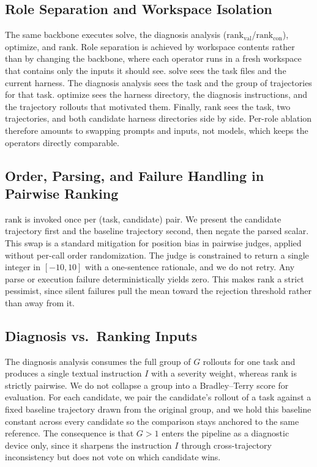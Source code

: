\documentclass{llmxive}
\begin{document}
\subsection{Role Separation and Workspace Isolation}

 The same backbone executes $\mathrm{solve}$, the diagnosis analysis ($\mathrm{rank}_{\mathrm{val}}$/$\mathrm{rank}_{\mathrm{con}}$), $\mathrm{optimize}$, and $\mathrm{rank}$. Role separation is achieved by workspace contents rather than by changing the backbone, where each operator runs in a fresh workspace that contains only the inputs it should see. $\mathrm{solve}$ sees the task files and the current harness. The diagnosis analysis sees the task and the group of trajectories for that task. $\mathrm{optimize}$ sees the harness directory, the diagnosis instructions, and the trajectory rollouts that motivated them. Finally, $\mathrm{rank}$ sees the task, two trajectories, and both candidate harness directories side by side. Per-role ablation therefore amounts to swapping prompts and inputs, not models, which keeps the operators directly comparable.

\subsection{Order, Parsing, and Failure Handling in Pairwise Ranking}

 $\mathrm{rank}$ is invoked once per (task, candidate) pair. We present the candidate trajectory first and the baseline trajectory second, then negate the parsed scalar. This swap is a standard mitigation for position bias in pairwise judges, applied without per-call order randomization. The judge is constrained to return a single integer in $[-10, 10]$ with a one-sentence rationale, and we do not retry. Any parse or execution failure deterministically yields zero. This makes $\mathrm{rank}$ a strict pessimist, since silent failures pull the mean toward the rejection threshold rather than away from it.

\subsection{Diagnosis vs.\ Ranking Inputs}

The diagnosis analysis consumes the full group of $G$ rollouts for one task and produces a single textual instruction $I$ with a severity weight, whereas $\mathrm{rank}$ is strictly pairwise. We do not collapse a group into a Bradley--Terry score for evaluation. For each candidate, we pair the candidate's rollout of a task against a fixed baseline trajectory drawn from the original group, and we hold this baseline constant across every candidate so the comparison stays anchored to the same reference. The consequence is that $G > 1$ enters the pipeline as a diagnostic device only, since it sharpens the instruction $I$ through cross-trajectory inconsistency but does not vote on which candidate wins.
\end{document}

